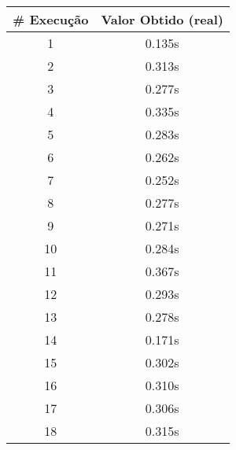 \documentclass[11pt]{article}
\begin{document}
\begin{table}[!h]
\begin{center}
\begin{minipage}{0.48\textwidth}
\begin{tabular}{| c | c |}
			\hline
				\textbf{\# Execução} &  \textbf{Valor Obtido (real)} \\ \hline
				1 & 0.135s \\ \hline
				2 & 0.313s \\ \hline
				3 & 0.277s \\ \hline
				4 & 0.335s \\ \hline
				5 & 0.283s \\ \hline
				6 & 0.262s \\ \hline
				7 & 0.252s \\ \hline
				8 & 0.277s \\ \hline
				9 & 0.271s \\ \hline
				10 & 0.284s \\ \hline
				11 & 0.367s \\ \hline
				12 & 0.293s \\ \hline
				13 & 0.278s \\ \hline
				14 & 0.171s \\ \hline
				15 & 0.302s \\ \hline
				16 & 0.310s \\ \hline
				17 & 0.306s \\ \hline
				18 & 0.315s \\ \hline
			\end{tabular}
		\end{minipage}
	\end{center}
\end{table}
\end{document}
